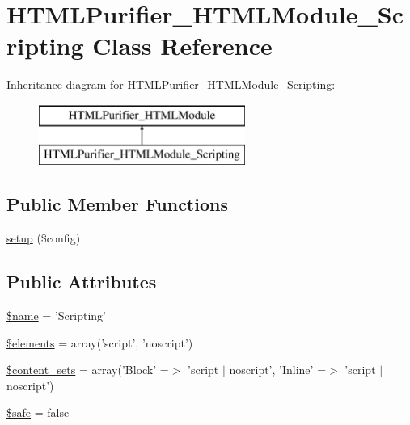 \hypertarget{classHTMLPurifier__HTMLModule__Scripting}{\section{H\+T\+M\+L\+Purifier\+\_\+\+H\+T\+M\+L\+Module\+\_\+\+Scripting Class Reference}
\label{classHTMLPurifier__HTMLModule__Scripting}
}
Inheritance diagram for H\+T\+M\+L\+Purifier\+\_\+\+H\+T\+M\+L\+Module\+\_\+\+Scripting\+:\begin{figure}[H]
\begin{center}
\leavevmode
\includegraphics[height=2.000000cm]{classHTMLPurifier__HTMLModule__Scripting}
\end{center}
\end{figure}
\subsection*{Public Member Functions}
\begin{DoxyCompactItemize}
\item 
\hyperlink{classHTMLPurifier__HTMLModule__Scripting_a7c215126f08dabaae9fd3f94a60d484e}{setup} (\$config)
\end{DoxyCompactItemize}
\subsection*{Public Attributes}
\begin{DoxyCompactItemize}
\item 
\hyperlink{classHTMLPurifier__HTMLModule__Scripting_a4e135ce2197c4d38cae6293ff410fc70}{\$name} = 'Scripting'
\item 
\hyperlink{classHTMLPurifier__HTMLModule__Scripting_a7e596ea05b36930db0fd8489e568c012}{\$elements} = array('script', 'noscript')
\item 
\hyperlink{classHTMLPurifier__HTMLModule__Scripting_adb1946f078e64352e5e038f41798f6f4}{\$content\+\_\+sets} = array('Block' =$>$ 'script $\vert$ noscript', 'Inline' =$>$ 'script $\vert$ noscript')
\item 
\hyperlink{classHTMLPurifier__HTMLModule__Scripting_a3d7746230db0a4bf2c093adc65e708fb}{\$safe} = false
\end{DoxyCompactItemize}


